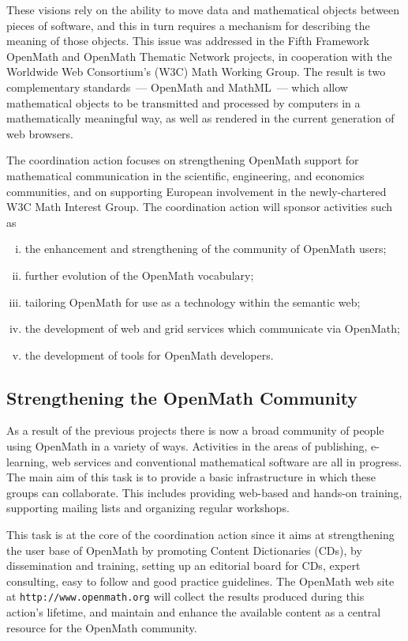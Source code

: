 \documentclass{euproposal}
\begin{document}
These visions rely on the ability to move data and mathematical
objects between pieces of software, and this in turn requires a
mechanism for describing the meaning of those objects.  This issue was
addressed in the Fifth Framework OpenMath and OpenMath Thematic
Network projects, in cooperation with the Worldwide Web Consortium's
(W3C) Math Working Group.  The result is two complementary
standards~--- OpenMath and MathML~--- which allow mathematical objects
to be transmitted and processed by computers in a mathematically
meaningful way, as well as rendered in the current generation of web
browsers.

The coordination action focuses on strengthening OpenMath support for
mathematical communication in the scientific, engineering, and
economics communities, and on supporting European involvement in the
newly-chartered W3C Math Interest Group.  The coordination action will
sponsor activities such as

\begin{enumerate}[(i)]
\item the enhancement and strengthening of the community of OpenMath
  users;
\item further evolution of the OpenMath vocabulary;
\item tailoring OpenMath for use as a technology within the semantic
  web;
\item the development of web and grid services which communicate via
  OpenMath;
\item the development of tools for OpenMath developers.
\end{enumerate}


\subsection{Strengthening the OpenMath Community}\label{community}


As a result of the previous projects there is now a broad community of
people using OpenMath in a variety of ways.  Activities in the areas
of publishing, e-learning, web services and conventional mathematical
software are all in progress.  The main aim of this task is to provide
a basic infrastructure in which these groups can collaborate. This
includes providing web-based and hands-on training, supporting mailing
lists and organizing regular workshops.

This task is at the core of the coordination action since it aims at
strengthening the user base of OpenMath by promoting Content
Dictionaries (CDs), by dissemination and training, setting up an
editorial board for CDs, expert consulting, easy to follow and good
practice guidelines. The OpenMath web site at
\texttt{http://www.openmath.org} will collect the results produced
during this action's lifetime, and maintain and enhance the available
content as a central resource for the OpenMath community.
\end{document}
